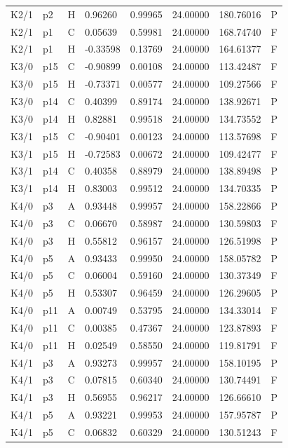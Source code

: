 \begin{longtable}{llllllll}
K2/1 & p2 & H & 0.96260 & 0.99965 & 24.00000 & 180.76016 & P \\
K2/1 & p1 & C & 0.05639 & 0.59981 & 24.00000 & 168.74740 & F \\
K2/1 & p1 & H & -0.33598 & 0.13769 & 24.00000 & 164.61377 & F \\
K3/0 & p15 & C & -0.90899 & 0.00108 & 24.00000 & 113.42487 & F \\
K3/0 & p15 & H & -0.73371 & 0.00577 & 24.00000 & 109.27566 & F \\
K3/0 & p14 & C & 0.40399 & 0.89174 & 24.00000 & 138.92671 & P \\
K3/0 & p14 & H & 0.82881 & 0.99518 & 24.00000 & 134.73552 & P \\
K3/1 & p15 & C & -0.90401 & 0.00123 & 24.00000 & 113.57698 & F \\
K3/1 & p15 & H & -0.72583 & 0.00672 & 24.00000 & 109.42477 & F \\
K3/1 & p14 & C & 0.40358 & 0.88979 & 24.00000 & 138.89498 & P \\
K3/1 & p14 & H & 0.83003 & 0.99512 & 24.00000 & 134.70335 & P \\
K4/0 & p3 & A & 0.93448 & 0.99957 & 24.00000 & 158.22866 & P \\
K4/0 & p3 & C & 0.06670 & 0.58987 & 24.00000 & 130.59803 & F \\
K4/0 & p3 & H & 0.55812 & 0.96157 & 24.00000 & 126.51998 & P \\
K4/0 & p5 & A & 0.93433 & 0.99950 & 24.00000 & 158.05782 & P \\
K4/0 & p5 & C & 0.06004 & 0.59160 & 24.00000 & 130.37349 & F \\
K4/0 & p5 & H & 0.53307 & 0.96459 & 24.00000 & 126.29605 & P \\
K4/0 & p11 & A & 0.00749 & 0.53795 & 24.00000 & 134.33014 & F \\
K4/0 & p11 & C & 0.00385 & 0.47367 & 24.00000 & 123.87893 & F \\
K4/0 & p11 & H & 0.02549 & 0.58550 & 24.00000 & 119.81791 & F \\
K4/1 & p3 & A & 0.93273 & 0.99957 & 24.00000 & 158.10195 & P \\
K4/1 & p3 & C & 0.07815 & 0.60340 & 24.00000 & 130.74491 & F \\
K4/1 & p3 & H & 0.56955 & 0.96217 & 24.00000 & 126.66610 & P \\
K4/1 & p5 & A & 0.93221 & 0.99953 & 24.00000 & 157.95787 & P \\
K4/1 & p5 & C & 0.06832 & 0.60329 & 24.00000 & 130.51243 & F \\

\end{longtable}
